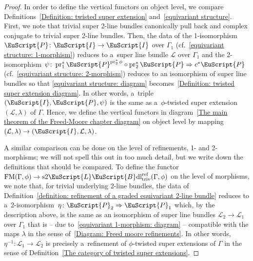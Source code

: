 \documentclass[10pt,a4paper]{amsart}
\numberwithin{equation}{section}
\def\mathscr#1{\EuScript{#1}}
\newcommand{\LineBdl}{\mathscr{L}\mathscr{B}\mathrm{dl}}
\newcommand{\stwoLineBdltriv}{\mathrm{s}2\LineBdl_{\mathrm{triv}}}
\begin{document}
\begin{proof}
 In order to define the vertical functors on object level, we compare Definitions~\ref{Definition: twisted super extension} and~\ref{equivariant structure}.
 First, we note that trivial super 2-line bundles canonically pull back and complex conjugate to trivial super 2-line bundles.
 Then, the data of the 1-isomorphism $\mathscr{P} \colon \mathscr{I} \to \mathscr{I}$ over $\Gamma_1$ (cf.\ \eqref{equivariant structure: 1-morphism})
 reduces to a~super line bundle $\mathcal{L}$ over $\Gamma_1$
 and the 2-isomorphism $\psi\colon \operatorname{pr}_1^*\mathscr{P}^{\operatorname{pr}_2^*\phi} \circ \operatorname{pr}_2^*\mathscr{P}
 \Rightarrow c^*\mathscr{P}$ (cf.\ \eqref{equivariant structure: 2-morphism}) reduces to an isomorphism
  of super line bundles so that
 \eqref{equivariant structure: diagram} becomes~\eqref{Definition: twisted super extension diagram}. In other words, a~triple
 $(\mathscr{I},\mathscr{P},\psi)$ is the same as a~$\phi$-twisted super extension $(\mathcal{L},\lambda)$ of $\Gamma$. Hence, we define
 the vertical functors in diagram~\eqref{The main theorem of the Freed-Moore chapter diagram} on object level by mapping $(\mathcal{L},\lambda) \to (\mathscr{I},\mathcal{L},\lambda)$.

 A similar comparison can be done on the level of refinements, 1- and 2-morphisms; we will not spell this out in too much detail, but we write down the definitions
 that should be compared. To define the functor $\mathrm{FM}(\Gamma,\phi) \to \stwoLineBdltriv^{\mathrm{ref}}(\Gamma,\phi)$ on the level of morphisms, we note that, for trivial underlying 2-line bundles,
 the data of Definition~\ref{definition: refinement of a graded equivariant 2-line bundle} reduces to a~2-isomorphism~${\eta \colon \mathscr{P}_2 \Rightarrow \mathscr{P}_1}$
 which, by the description above, is the same as an isomorphism of super line bundles $\mathcal{L}_2 \to \mathcal{L}_1$ over $\Gamma_1$ that is -- due to~\eqref{equivariant 1-morphism: diagram} -- compatible
 with the maps $\lambda$ in the sense of~\eqref{Diagram: Freed moore refinements}.
 In other words, $\eta^{-1} \colon \mathcal{L}_1 \to \mathcal{L}_2$ is precisely a~refinement of $\phi$-twisted super extensions of $\Gamma$
 in the sense of Definition~\ref{The category of twisted super extensions}.


\end{proof}
\end{document}
